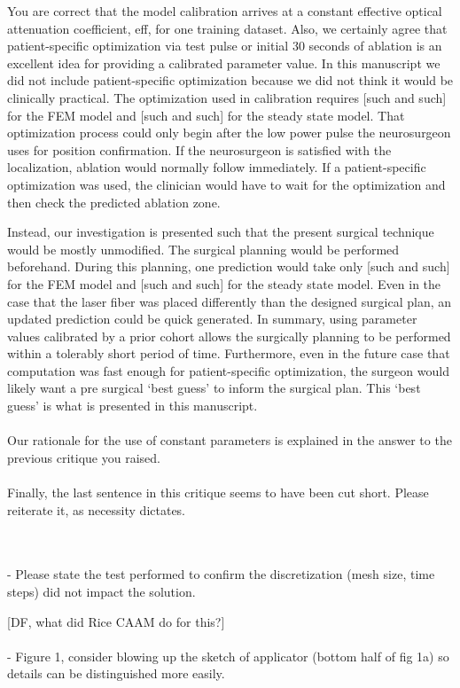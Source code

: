 \documentclass[letterpaper,12pt]{report}
\begin{document}
{\color{red}
You are correct that the model calibration arrives at a constant effective optical attenuation coefficient,
eff, for one training dataset. Also, we certainly agree that patient-specific optimization via test pulse
or initial 30 seconds of ablation is an excellent idea for providing a calibrated parameter value. In this
manuscript we did not include patient-specific optimization because we did not think it would be
clinically practical. The optimization used in calibration requires [such and such] for the FEM model
and [such and such] for the steady state model. That optimization process could only begin after the low
power pulse the neurosurgeon uses for position confirmation. If the neurosurgeon is satisfied with the
localization, ablation would normally follow immediately. If a patient-specific optimization was
used, the clinician would have to wait for the optimization and then check the predicted ablation
zone.

Instead, our investigation is presented such that the present surgical technique would be mostly unmodified.
The surgical planning would be performed beforehand. During this planning, one prediction would take only
[such and such] for the FEM model and [such and such] for the steady state model. Even in the case that the
laser fiber was placed differently than the designed surgical plan, an updated prediction could be quick
generated. In summary, using parameter values calibrated by a prior cohort allows the surgically
planning to be performed within a tolerably short period of time. Furthermore, even in the future case
that computation was fast enough for patient-specific optimization, the surgeon would likely want a pre
surgical `best guess' to inform the surgical plan. This `best guess' is what is presented in this manuscript.
\\ \\
Our rationale for the use of constant parameters is explained in the answer to the previous critique you raised.
\\ \\
Finally, the last sentence in this critique seems to have been cut short. Please reiterate it, as necessity dictates.
}\\
\\
- Please state the test performed to confirm the discretization (mesh size, time steps) did not impact the solution.

{\color{red}
{\color{green}[DF, what did Rice CAAM do for this?]}
}\\
\\
- Figure 1, consider blowing up the sketch of applicator (bottom half of fig 1a) so details can be distinguished more easily.
\end{document}
